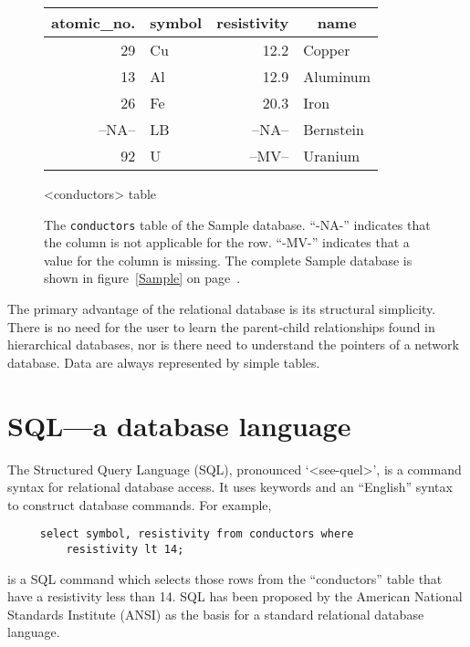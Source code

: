 \documentclass[11pt,a4paper]{report}
\begin{document}
\begin{figure}[htp]
\begin{center}
  \begin{tabular}[t]{|r|l|r|l|}
     \hline
     \multicolumn{1}{|c|}{atomic\_no.}&
     \multicolumn{1}{|c|}{symbol}&
     \multicolumn{1}{|c|}{resistivity}&
     \multicolumn{1}{|c|}{name}\\
     \hline
    29& Cu& 12.2  & Copper\\
    13& Al& 12.9  & Aluminum\\
    26& Fe& 20.3  & Iron\\
--NA--& LB&--NA--& Bernstein\\
    92& U &--MV--  & Uranium\\
     \hline
  \end{tabular}
    \par  {<conductors> table }
  \end{center}
\smallskip
\caption[{\tt conductors} table of the Sample database]
    {The {\tt conductors} table of the Sample database.
    ``-NA-'' indicates that the column is not applicable for
    the row.
    ``-MV-'' indicates that a value for the column is missing.
    The complete Sample database is shown in figure~\ref{Sample}
    on page~\pageref{Sample}.}
   \label{Sample-conductor}
\end{figure}
 
 
The primary advantage of the relational database is its
structural simplicity.  There is no need for the user to
learn the parent-child relationships found in hierarchical
databases, nor is there need to understand the pointers
of a network database.
Data are always represented by simple tables.
 
 
 
 
 
 
 
\section{SQL---a database language}
The Structured Query Language (SQL), pronounced `<see-quel\/>',
is a command syntax for relational
database access.  It uses keywords and an ``English'' syntax
to construct database commands.  For example,
 
\begin{verbatim}
     select symbol, resistivity from conductors where
         resistivity lt 14;
\end{verbatim}
 
\noindent
is a SQL command which selects those rows from the ``conductors''
table that have a resistivity less than 14.
SQL has been proposed by the American National Standards Institute (ANSI)
as the basis for a standard relational database language.
 
\end{document}
